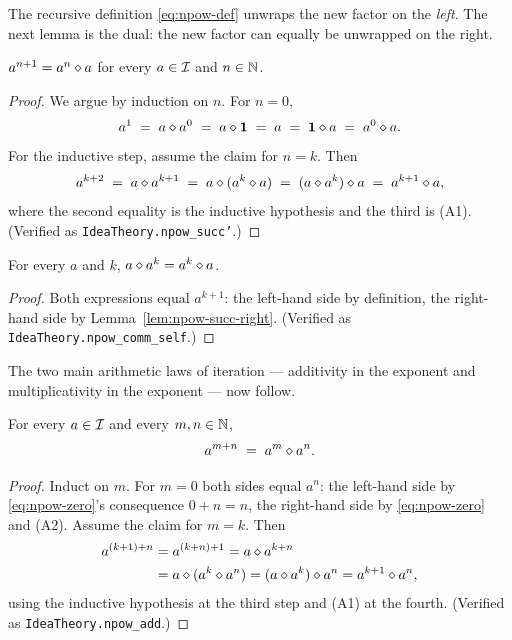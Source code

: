 The recursive definition \eqref{eq:npow-def} unwraps the new factor on
the \emph{left}.  The next lemma is the dual: the new factor can equally
be unwrapped on the right.

\begin{lemma}\label{lem:npow-succ-right}
$a^{n+1} = a^n \mathbin{\diamond} a$ for every $a \in \mathcal{I}$ and $n \in \mathbb{N}$.
\end{lemma}

\begin{proof}
We argue by induction on $n$.  For $n = 0$,
\[
a^1 \;=\; a \mathbin{\diamond} a^0 \;=\; a \mathbin{\diamond} \mathbf{1} \;=\; a
\;=\; \mathbf{1} \mathbin{\diamond} a \;=\; a^0 \mathbin{\diamond} a.
\]
For the inductive step, assume the claim for $n = k$.  Then
\[
a^{k+2}
\;=\; a \mathbin{\diamond} a^{k+1}
\;=\; a \mathbin{\diamond} (a^k \mathbin{\diamond} a)
\;=\; (a \mathbin{\diamond} a^k) \mathbin{\diamond} a
\;=\; a^{k+1} \mathbin{\diamond} a,
\]
where the second equality is the inductive hypothesis and the third is
(A1).  (Verified as \texttt{IdeaTheory.npow\_succ'}.)
\end{proof}

\begin{lemma}\label{lem:npow-self-commute}
For every $a$ and $k$, $a \mathbin{\diamond} a^k = a^k \mathbin{\diamond} a$.
\end{lemma}

\begin{proof}
Both expressions equal $a^{k+1}$: the left-hand side by definition, the
right-hand side by Lemma~\ref{lem:npow-succ-right}.  (Verified as
\texttt{IdeaTheory.npow\_comm\_self}.)
\end{proof}

The two main arithmetic laws of iteration --- additivity in the exponent
and multiplicativity in the exponent --- now follow.

\begin{lemma}\label{lem:npow-add}
For every $a \in \mathcal{I}$ and every $m, n \in \mathbb{N}$,
\begin{equation}\label{eq:npow-add}
a^{m+n} \;=\; a^m \mathbin{\diamond} a^n.
\end{equation}
\end{lemma}

\begin{proof}
Induct on $m$.  For $m = 0$ both sides equal $a^n$: the left-hand side
by \eqref{eq:npow-zero}'s consequence $0+n = n$, the right-hand side by
\eqref{eq:npow-zero} and (A2).  Assume the claim for $m = k$.  Then
\begin{align*}
a^{(k+1)+n}
&= a^{(k+n)+1}
= a \mathbin{\diamond} a^{k+n} \\
&= a \mathbin{\diamond} (a^k \mathbin{\diamond} a^n)
= (a \mathbin{\diamond} a^k) \mathbin{\diamond} a^n
= a^{k+1} \mathbin{\diamond} a^n,
\end{align*}
using the inductive hypothesis at the third step and (A1) at the fourth.
(Verified as \texttt{IdeaTheory.npow\_add}.)
\end{proof}

